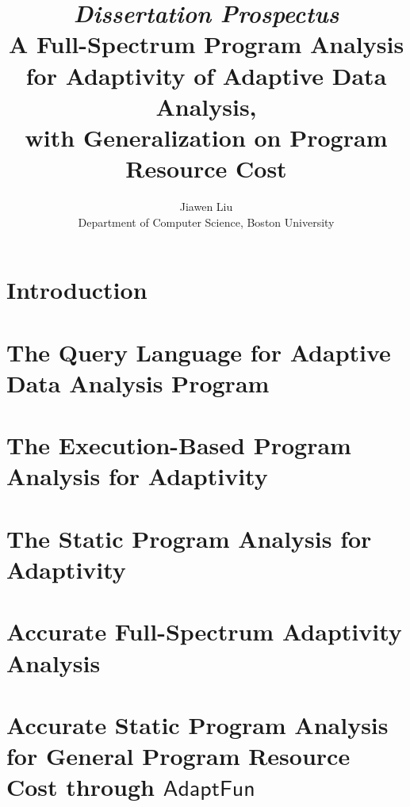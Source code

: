 \documentclass[a4paper,11pt]{article}
\newcommand{\THESYSTEM}{\textsf{AdaptFun}}
\begin{document}
\title{{\em Dissertation Prospectus}
\\ {A Full-Spectrum Program Analysis for Adaptivity of Adaptive Data Analysis}, 
\\ with Generalization on Program Resource Cost}

\author{Jiawen Liu\\ Department of Computer Science, Boston University}
\maketitle
\begin{abstract}

\end{abstract}

\clearpage
\tableofcontents{}

\clearpage
\section{Introduction}
\label{sec:introduction}


\section{The Query Language for Adaptive Data Analysis Program}
\label{sec:language}


\section{The Execution-Based Program Analysis for Adaptivity}
\label{sec:dynamic}


\section{The Static Program Analysis for Adaptivity}
\label{sec:static}



\section{Accurate Full-Spectrum Adaptivity Analysis}
\label{sec:furthers}


\section{Accurate Static Program Analysis for General Program Resource Cost through $\THESYSTEM$}
\label{sec:generalization}

\end{document}
